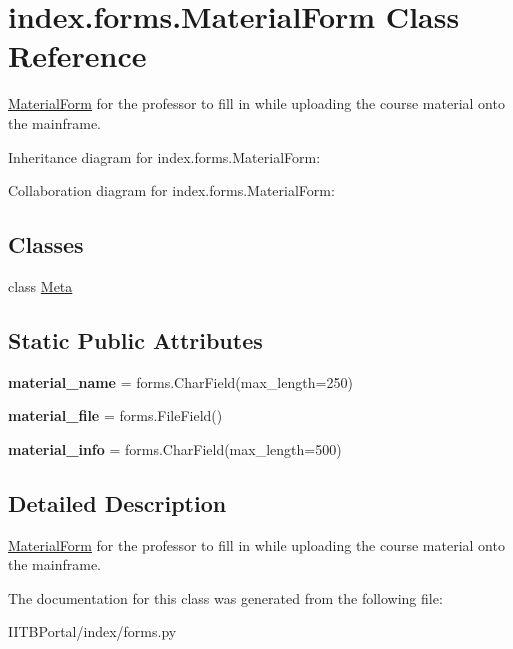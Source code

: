 \hypertarget{classindex_1_1forms_1_1MaterialForm}{}\section{index.\+forms.\+Material\+Form Class Reference}
\label{classindex_1_1forms_1_1MaterialForm}


\hyperlink{classindex_1_1forms_1_1MaterialForm}{Material\+Form} for the professor to fill in while uploading the course material onto the mainframe.  




Inheritance diagram for index.\+forms.\+Material\+Form\+:


Collaboration diagram for index.\+forms.\+Material\+Form\+:
\subsection*{Classes}
\begin{DoxyCompactItemize}
\item 
class \hyperlink{classindex_1_1forms_1_1MaterialForm_1_1Meta}{Meta}
\end{DoxyCompactItemize}
\subsection*{Static Public Attributes}
\begin{DoxyCompactItemize}
\item 
\mbox{\label{classindex_1_1forms_1_1MaterialForm_a63c6a62edb2f749f08e02a2ac27c4dce}} 
{\bfseries material\+\_\+name} = forms.\+Char\+Field(max\+\_\+length=250)
\item 
\mbox{\label{classindex_1_1forms_1_1MaterialForm_aad6300bb4ab608f4802850fe69cb45dc}} 
{\bfseries material\+\_\+file} = forms.\+File\+Field()
\item 
\mbox{\label{classindex_1_1forms_1_1MaterialForm_a0f56473f1da9b70467098ae346575c41}} 
{\bfseries material\+\_\+info} = forms.\+Char\+Field(max\+\_\+length=500)
\end{DoxyCompactItemize}


\subsection{Detailed Description}
\hyperlink{classindex_1_1forms_1_1MaterialForm}{Material\+Form} for the professor to fill in while uploading the course material onto the mainframe. 



The documentation for this class was generated from the following file\+:\begin{DoxyCompactItemize}
\item 
I\+I\+T\+B\+Portal/index/forms.\+py\end{DoxyCompactItemize}
